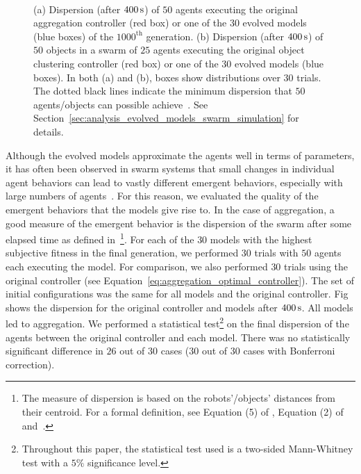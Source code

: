 \begin{figure}[!t]
	\centering
		\\
		\caption{(a) Dispersion (after $\unit[400]{s}$) of $50$ agents executing the original aggregation controller (red box) or one of the $30$ evolved models (blue boxes) of the $1000^\mathrm{th}$ generation. (b) Dispersion (after $\unit[400]{s}$) of $50$ objects in a swarm of $25$ agents executing the original object clustering controller (red box) or one of the $30$ evolved models (blue boxes). In both (a) and (b), boxes show distributions over $30$ trials. The dotted black lines indicate the minimum dispersion that $50$ agents/objects can possible achieve~\cite{Graham1990}. See Section~\ref{sec:analysis_evolved_models_swarm_simulation} for details.\label{fig:model_validation_simulation}}
\end{figure}

Although the evolved models approximate the agents well in terms of parameters, it has often been observed in swarm systems that small changes in individual agent behaviors can lead to vastly different emergent behaviors, especially with large numbers of agents~\cite{Paul2010}. For this reason, we evaluated the quality of the emergent behaviors that the models give rise to. In the case of aggregation, a good measure of the emergent behavior is the dispersion of the swarm after some elapsed time as defined in~\cite{Gauci2014_ijrr}\footnote{The measure of dispersion is based on the robots'/objects' distances from their centroid. For a formal definition, see Equation (5) of \cite{Gauci2014_ijrr}, Equation (2) of~\cite{Melvin2014_aamas} and~\cite{Graham1990}.}. For each of the $30$ models with the highest subjective fitness in the final generation, we performed $30$ trials with $50$ agents each executing the model. For comparison, we also performed $30$ trials using the original controller (see Equation~\eqref{eq:aggregation_optimal_controller}). The set of initial configurations was the same for all models and the original controller. Fig~ shows the dispersion for the original controller and models after $\unit[400]{s}$. All models led to aggregation. We performed a statistical test\footnote{Throughout this paper, the statistical test used is a two-sided Mann-Whitney test with a $5\%$ significance level.} on the final dispersion of the agents between the original controller and each model. There was no statistically significant difference in $26$ out of $30$ cases ($30$ out of $30$ cases with Bonferroni correction). 

